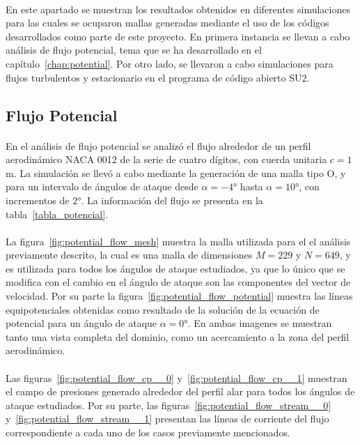 \documentclass[letterpaper, openright, 12pt]{book}
\begin{document}
    \paragraph*{}
    En este apartado se muestran los resultados obtenidos en diferentes
    simulaciones para las cuales se ocuparon mallas generadas mediante el uso
    de los códigos desarrollados como parte de este proyecto. En primera
    instancia se llevan a cabo análisis de flujo potencial, tema que se ha
    desarrollado en el capítulo~\ref{chap:potential}. Por otro lado, se
    llevaron a cabo simulaciones para flujos turbulentos y estacionario en el
    programa de código abierto SU2.



    \subsection{Flujo Potencial}
    \paragraph*{}
    En el análisis de flujo potencial se analizó el flujo alrededor de un
    perfil aerodinámico NACA 0012 de la serie de cuatro dígitos, con cuerda
    unitaria $c = 1$ m. La simulación se llevó a cabo mediante la generación
    de una malla tipo O, y para un intervalo de ángulos de ataque desde
    $\alpha = -4\si{\degree}$ hasta $\alpha = 10\si{\degree}$, con incrementos
    de $2\si{\degree}$. La información del flujo se presenta en la
    tabla~\ref{tabla_potencial}.

    \paragraph*{}
    La figura~\ref{fig:potential_flow_mesh} muestra la malla utilizada para el
    el análisis previamente descrito, la cual es una malla de
    dimensiones $M = 229$ y $N = 649$, y es utilizada para todos los ángulos de
    ataque estudiados, ya que lo único que se modifica con el cambio en el
    ángulo de ataque son las componentes del vector de velocidad. Por su parte
    la figura~\ref{fig:potential_flow_potential} muestra las líneas
    equipotenciales obtenidas como resultado de la solución de la ecuación de
    potencial para un ángulo de ataque $\alpha = 0\si{\degree}$. En ambas
    imagenes se muestran tanto una vista completa del dominio, como un
    acercamiento a la zona del perfil aerodinámico.

    \paragraph*{}
    Las figuras~\ref{fig:potential_flow_cp__0} y~\ref{fig:potential_flow_cp__1}
    muestran el campo de presiones generado alrededor del perfil alar para
    todos los ángulos de ataque estudiados. Por su parte, las
    figuras~\ref{fig:potential_flow_stream__0}
    y~\ref{fig:potential_flow_stream__1} presentan las líneas de corriente del
    flujo correspondiente a cada uno de los casos previamente mencionados.
\end{document}
